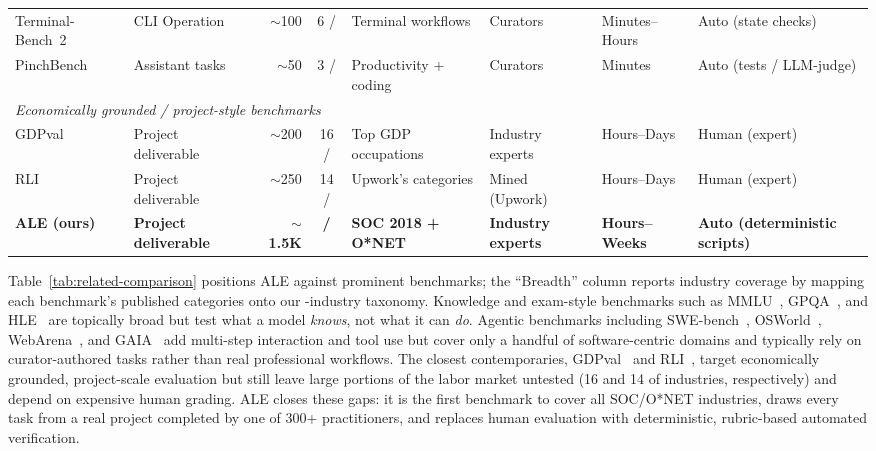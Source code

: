 \begin{table}[t]
{\begin{tabular}{l l r c l l l l}
Terminal-Bench~2~\citep{merrill2026terminalbench} & CLI Operation & $\sim$100 & 6 / \taskcount{}  & Terminal workflows    & Curators                      & Minutes--Hours & Auto (state checks) \\
PinchBench~\citep{pinchbench2026}          & Assistant tasks    & $\sim$50  & 3 / \taskcount{}  & Productivity + coding & Curators                      & Minutes        & Auto (tests / LLM-judge) \\
\midrule
\multicolumn{8}{l}{\textit{Economically grounded / project-style benchmarks}} \\
GDPval~\citep{patwardhan2025gdpval}        & Project deliverable & $\sim$200 & 16 / \taskcount{} & Top GDP occupations  & Industry experts              & Hours--Days    & Human (expert) \\
RLI~\citep{mazeika2025rli}                 & Project deliverable & $\sim$250 & 14 / \taskcount{} & Upwork's categories & Mined (Upwork)              & Hours--Days    & Human (expert) \\
\textbf{ALE (ours)}                        & \textbf{Project deliverable} & \textbf{$\sim$1.5K} & \textbf{\taskcount{} / \taskcount{}} & \textbf{SOC 2018 + O*NET} & \textbf{Industry experts}     & \textbf{Hours--Weeks} & \textbf{Auto (deterministic scripts)} \\
\bottomrule
\end{tabular}%
}
\end{table}

Table~\ref{tab:related-comparison} positions ALE against prominent benchmarks; the ``Breadth'' column reports industry coverage by mapping each benchmark's published categories onto our \taskcount{}-industry taxonomy.
Knowledge and exam-style benchmarks such as MMLU~\citep{hendrycks2021measuring}, GPQA~\citep{rein2024gpqa}, and HLE~\citep{phan2026hle} are topically broad but test what a model \emph{knows}, not what it can \emph{do}.
Agentic benchmarks including SWE-bench~\citep{jimenez2024swebench}, OSWorld~\citep{xie2024osworld}, WebArena~\citep{zhou2024webarena}, and GAIA~\citep{mialon2024gaia} add multi-step interaction and tool use but cover only a handful of software-centric domains and typically rely on curator-authored tasks rather than real professional workflows.
The closest contemporaries, GDPval~\citep{patwardhan2025gdpval} and RLI~\citep{mazeika2025rli}, target economically grounded, project-scale evaluation but still leave large portions of the labor market untested (16 and 14 of \taskcount{} industries, respectively) and depend on expensive human grading.
ALE closes these gaps: it is the first benchmark to cover all \taskcount{} SOC/O*NET industries, draws every task from a real project completed by one of 300+ practitioners, and replaces human evaluation with deterministic, rubric-based automated verification.

